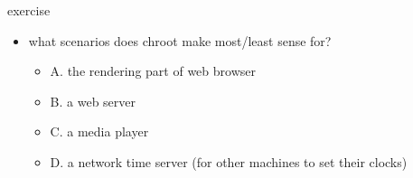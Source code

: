 \begin{frame}{exercise}
    \begin{itemize}
    \item what scenarios does chroot make most/least sense for?
    \begin{itemize}
        \item A. the rendering part of web browser
        \item B. a web server
        \item C. a media player
        \item D. a network time server (for other machines to set their clocks)
    \end{itemize}
    \end{itemize}
\end{frame}
